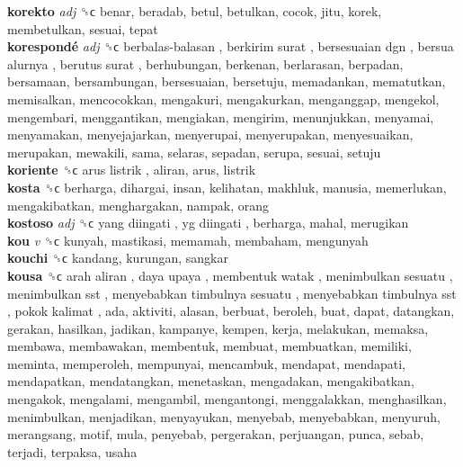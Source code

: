 \textbf{korekto} \emph{adj}  ␝ϲ  benar, beradab, betul, betulkan, cocok, jitu, korek, membetulkan, sesuai, tepat  \\
\textbf{korespondé} \emph{adj}  ␝ϲ   berbalas-balasan ,  berkirim surat ,  bersesuaian dgn ,  bersua alurnya ,  berutus surat , berhubungan, berkenan, berlarasan, berpadan, bersamaan, bersambungan, bersesuaian, bersetuju, memadankan, mematutkan, memisalkan, mencocokkan, mengakuri, mengakurkan, menganggap, mengekol, mengembari, menggantikan, mengiakan, mengirim, menunjukkan, menyamai, menyamakan, menyejajarkan, menyerupai, menyerupakan, menyesuaikan, merupakan, mewakili, sama, selaras, sepadan, serupa, sesuai, setuju  \\
\textbf{koriente} ␝ϲ   arus listrik , aliran, arus, listrik  \\
\textbf{kosta} ␝ϲ  berharga, dihargai, insan, kelihatan, makhluk, manusia, memerlukan, mengakibatkan, menghargakan, nampak, orang  \\
\textbf{kostoso} \emph{adj}  ␝ϲ   yang diingati ,  yg diingati , berharga, mahal, merugikan  \\
\textbf{kou} \emph{v}  ␝ϲ  kunyah, mastikasi, memamah, membaham, mengunyah  \\
\textbf{kouchi} ␝ϲ  kandang, kurungan, sangkar  \\
\textbf{kousa} ␝ϲ   arah aliran ,  daya upaya ,  membentuk watak ,  menimbulkan sesuatu ,  menimbulkan sst ,  menyebabkan timbulnya sesuatu ,  menyebabkan timbulnya sst ,  pokok kalimat , ada, aktiviti, alasan, berbuat, beroleh, buat, dapat, datangkan, gerakan, hasilkan, jadikan, kampanye, kempen, kerja, melakukan, memaksa, membawa, membawakan, membentuk, membuat, membuatkan, memiliki, meminta, memperoleh, mempunyai, mencambuk, mendapat, mendapati, mendapatkan, mendatangkan, menetaskan, mengadakan, mengakibatkan, mengakok, mengalami, mengambil, mengantongi, menggalakkan, menghasilkan, menimbulkan, menjadikan, menyayukan, menyebab, menyebabkan, menyuruh, merangsang, motif, mula, penyebab, pergerakan, perjuangan, punca, sebab, terjadi, terpaksa, usaha  \\
